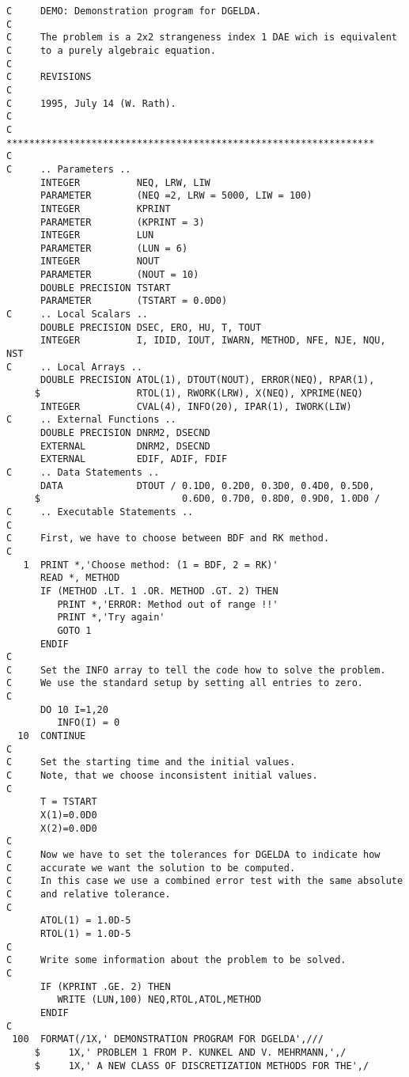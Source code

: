 \begin{verbatim}
C     DEMO: Demonstration program for DGELDA.
C
C     The problem is a 2x2 strangeness index 1 DAE wich is equivalent
C     to a purely algebraic equation.
C
C     REVISIONS
C
C     1995, July 14 (W. Rath).
C
C     *****************************************************************
C
C     .. Parameters ..
      INTEGER          NEQ, LRW, LIW
      PARAMETER        (NEQ =2, LRW = 5000, LIW = 100)
      INTEGER          KPRINT
      PARAMETER        (KPRINT = 3)
      INTEGER          LUN
      PARAMETER        (LUN = 6)
      INTEGER          NOUT
      PARAMETER        (NOUT = 10)
      DOUBLE PRECISION TSTART
      PARAMETER        (TSTART = 0.0D0)
C     .. Local Scalars ..
      DOUBLE PRECISION DSEC, ERO, HU, T, TOUT
      INTEGER          I, IDID, IOUT, IWARN, METHOD, NFE, NJE, NQU, NST
C     .. Local Arrays ..
      DOUBLE PRECISION ATOL(1), DTOUT(NOUT), ERROR(NEQ), RPAR(1),
     $                 RTOL(1), RWORK(LRW), X(NEQ), XPRIME(NEQ)
      INTEGER          CVAL(4), INFO(20), IPAR(1), IWORK(LIW)
C     .. External Functions ..
      DOUBLE PRECISION DNRM2, DSECND
      EXTERNAL         DNRM2, DSECND
      EXTERNAL         EDIF, ADIF, FDIF
C     .. Data Statements ..
      DATA             DTOUT / 0.1D0, 0.2D0, 0.3D0, 0.4D0, 0.5D0,
     $                         0.6D0, 0.7D0, 0.8D0, 0.9D0, 1.0D0 /
C     .. Executable Statements ..
C
C     First, we have to choose between BDF and RK method.
C
   1  PRINT *,'Choose method: (1 = BDF, 2 = RK)'
      READ *, METHOD
      IF (METHOD .LT. 1 .OR. METHOD .GT. 2) THEN
         PRINT *,'ERROR: Method out of range !!'
         PRINT *,'Try again'
         GOTO 1
      ENDIF
C
C     Set the INFO array to tell the code how to solve the problem.
C     We use the standard setup by setting all entries to zero.
C
      DO 10 I=1,20
         INFO(I) = 0
  10  CONTINUE
C
C     Set the starting time and the initial values.
C     Note, that we choose inconsistent initial values.
C
      T = TSTART
      X(1)=0.0D0
      X(2)=0.0D0
C
C     Now we have to set the tolerances for DGELDA to indicate how
C     accurate we want the solution to be computed.
C     In this case we use a combined error test with the same absolute
C     and relative tolerance.
C
      ATOL(1) = 1.0D-5
      RTOL(1) = 1.0D-5
C
C     Write some information about the problem to be solved.
C
      IF (KPRINT .GE. 2) THEN
         WRITE (LUN,100) NEQ,RTOL,ATOL,METHOD
      ENDIF
C
 100  FORMAT(/1X,' DEMONSTRATION PROGRAM FOR DGELDA',///
     $     1X,' PROBLEM 1 FROM P. KUNKEL AND V. MEHRMANN,',/
     $     1X,' A NEW CLASS OF DISCRETIZATION METHODS FOR THE',/

\end{verbatim}
